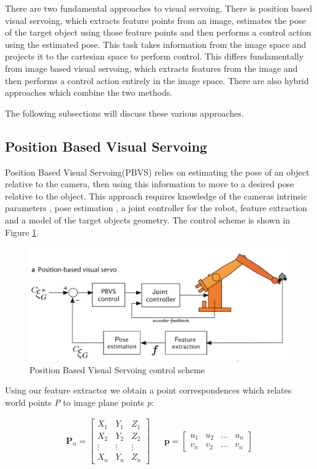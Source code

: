 \documentclass{UoNMCHA}
\numberwithin{equation}{section}
\begin{document}
There are two fundamental approaches to visual servoing. There is position based visual servoing, which extracts feature points from an image, estimates the pose of the target object using those feature points and then performs a control action using the estimated pose. This task takes information from the image space and projects it to the cartesian space to perform control. This differs fundamentally from image based visual servoing, which extracts features from the image and then performs a control action entirely in the image space. There are also hybrid approaches which combine the two methods.  

The following subsections will discuss these various approaches.


\subsection{Position Based Visual Servoing }\label{PBVS}

Position Based Visual Servoing(PBVS) relies on estimating the pose of an object relative to the camera, then using this information to move to a desired pose relative to the object. This approach requires knowledge of the cameras intrinsic parameters , pose estimation , a joint controller for the robot, feature extraction and a model of the target objects geometry. The control scheme is shown in Figure \ref{fig:PBVScontrolscheme}. 

\begin{figure}[H]
	\begin{center}
		\includegraphics[width=.8\linewidth]{Figures/PBVScontrolscheme}
		\caption{Position Based Visual Servoing control scheme}
		\label{fig:PBVScontrolscheme}
	\end{center}
\end{figure}

Using our feature extractor we obtain a point correspondences which relates world points \textit{P} to image plane points \textit{p}: 

\begin{align*}
	\mathbf{P}_{n} = 
	\begin{bmatrix} 
	X_{1} & Y_{1} & Z_{1}  \\
	X_{2} & Y_{2} & Z_{2}  \\
	\vdots & \vdots & \vdots\\
	X_{n} & Y_{n} & Z_{n}  
	\end{bmatrix} & &
	\mathbf{p} = 
	\begin{bmatrix} 
	u_{1} & u_{2} &  \dots & u_{n}  \\
	v_{n} & v_{2} & \dots & v_{n}  
	\end{bmatrix}
\end{align*} 
\end{document}
